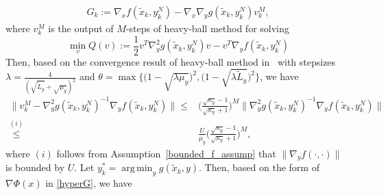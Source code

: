 \documentclass{osudissert96}
\DeclareMathOperator*{\argmin}{arg\,min}
\begin{document}
\begin{align}
G_k:= \nabla_x f(\widetilde x_k,y_k^N) -\nabla_x \nabla_y g(\widetilde x_k,y_k^N)v_k^M,
\end{align}
where $v_k^M$ is the output of $M$-steps of heavy-ball method for solving $$\min_v Q(v):=\frac{1}{2}v^T\nabla_y^2 g(\widetilde x_k,y_k^N) v - v^T
\nabla_y f(\widetilde x_k,y^N_k)$$
Then, based on the convergence result of heavy-ball method in~\cite{badithela2019analysis} with stepsizes $\lambda=\frac{4}{(\sqrt{\widetilde L_y}+\sqrt{\mu_y})^2}$ and $\theta=\max\big\{\big(1-\sqrt{\lambda\mu_y}\big)^2,\big(1-\sqrt{\lambda\widetilde L_y}\big)^2\big\}$, we have 
\begin{align}\label{gg:opascas}
\|v_k^M - \nabla_y^2 g(\widetilde x_k,y_k^N)^{-1}\nabla_y f(\widetilde x_k,y^N_k) \| \leq  &\Big(\frac{\sqrt{\kappa_y}-1}{\sqrt{\kappa_y}+1}\Big)^M \Big\| \nabla_y^2 g(\widetilde x_k,y_k^N)^{-1}\nabla_y f(\widetilde x_k,y^N_k)\Big\| \nonumber
\\\overset{(i)}\leq& \frac{U}{\mu_y}\Big(\frac{\sqrt{\kappa_y}-1}{\sqrt{\kappa_y}+1}\Big)^M, %
\end{align}
where $(i)$ follows from Assumption~\ref{bounded_f_assump} that  $\|\nabla_y f(\cdot,\cdot)\|$ is bounded by $U$. Let $y_k^*=\argmin_{y} g(\widetilde x_k,y)$. Then, based on the form of $\nabla\Phi(x)$ in \cref{hyperG}, we have 
\end{document}
